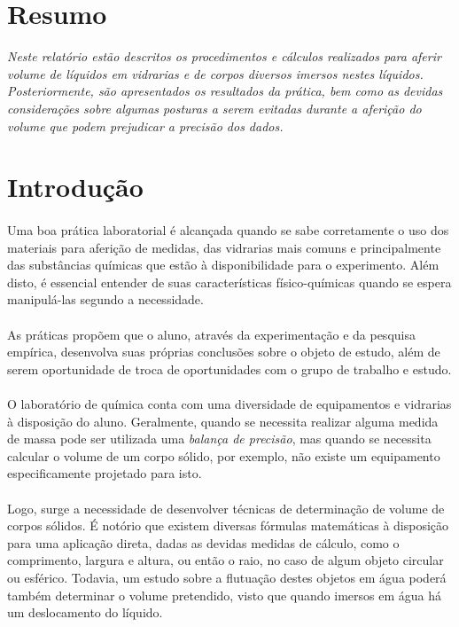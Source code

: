 \documentclass[12pt]{article}
\begin{document}
\section{Resumo}
\textit{Neste relatório estão descritos os procedimentos e cálculos realizados para aferir volume de líquidos em vidrarias e de corpos diversos imersos nestes líquidos. Posteriormente, são apresentados os resultados da prática, bem como as devidas considerações sobre algumas posturas a serem evitadas durante a aferição do volume que podem prejudicar a precisão dos dados.}\\[1.0cm]

\section{Introdução}

\paragraph*{}
Uma boa prática laboratorial é alcançada quando se sabe corretamente o uso dos materiais para aferição de medidas, das vidrarias mais comuns e principalmente das substâncias químicas que estão à disponibilidade para o experimento. Além disto, é essencial entender de suas características físico-químicas quando se espera manipulá-las segundo a necessidade.
\paragraph*{}
As práticas propõem que o aluno, através da experimentação e da pesquisa empírica, desenvolva suas próprias conclusões sobre o objeto de estudo, além de serem oportunidade de troca de oportunidades com o grupo de trabalho e estudo. 
\paragraph*{}
O laboratório de química conta com uma diversidade de equipamentos e vidrarias à disposição do aluno. Geralmente, quando se necessita realizar alguma medida de massa pode ser utilizada uma \textit{balança de precisão}, mas quando se necessita calcular o volume de um corpo sólido, por exemplo, não existe um equipamento especificamente projetado para isto. 
\paragraph*{}
Logo, surge a necessidade de desenvolver técnicas de determinação de volume de corpos sólidos. É notório que existem diversas fórmulas matemáticas à disposição para uma aplicação direta, dadas as devidas medidas de cálculo, como o comprimento, largura e altura, ou então o raio, no caso de algum objeto circular ou esférico. Todavia, um estudo sobre a flutuação destes objetos em água poderá também determinar o volume pretendido, visto que quando imersos em água há um deslocamento do líquido. 
\end{document}
